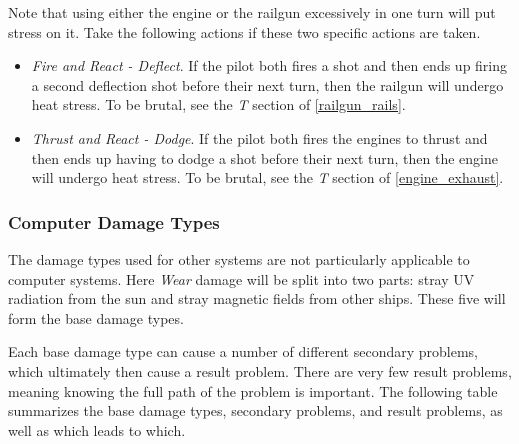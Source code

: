 \documentclass[a4paper]{article}
\begin{document}
\vspace{0.2cm} \hspace{-17pt} Note that using either the engine or the railgun excessively in one turn will put stress on it. Take the following actions if these two specific actions are taken.
\begin{itemize}
\item \textit{Fire and React - Deflect}. If the pilot both fires a shot and then ends up firing a second deflection shot before their next turn, then the railgun will undergo heat stress. To be brutal, see the \textit{T} section of \ref{railgun_rails}.
\item \textit{Thrust and React - Dodge}. If the pilot both fires the engines to thrust and then ends up having to dodge a shot before their next turn, then the engine will undergo heat stress. To be brutal, see the \textit{T} section of \ref{engine_exhaust}.
\end{itemize}


\subsubsection{Computer Damage Types} \label{fighter_computer_damage_types}

The damage types used for other systems are not particularly applicable to computer systems. Here \textit{Wear} damage will be split into two parts: stray UV radiation from the sun and stray magnetic fields from other ships. These five will form the base damage types.

Each base damage type can cause a number of different secondary problems, which ultimately then cause a result problem. There are very few result problems, meaning knowing the full path of the problem is important. The following table summarizes the base damage types, secondary problems, and result problems, as well as which leads to which.
\end{document}
